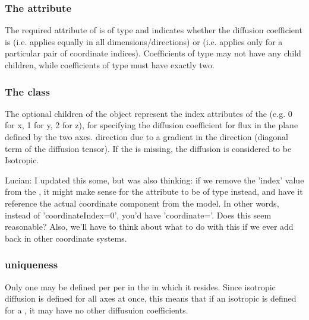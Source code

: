 \subsubsection{The  attribute}
The required  attribute of \DiffusionCoefficient is of type  and indicates whether the diffusion coefficient is  (i.e. applies equally in all dimensions/directions) or  (i.e. applies only for a particular pair of coordinate indices).  Coefficients of type  may not have any child \CoordinateIndex children, while coefficients of type  must have exactly two.


\subsubsection{The  class}
\label{CoordinateIndex-class}
The optional \CoordinateIndex children of the \DiffusionCoefficient object represent the index attributes of the \CoordinateComponent (e.g. 0 for x, 1 for y, 2 for z), for specifying the diffusion coefficient for flux in the plane defined by the two \CoordinateIndex axes.  
 direction due to a gradient in the  direction (diagonal term of the diffusion tensor).  If the  is missing, the diffusion is considered to be Isotropic.

{\color{red} Lucian: \notice I updated this some, but was also thinking:  if we remove the 'index' value from the \CoordinateComponent, it might make sense for the  attribute to be of type  instead, and have it reference the actual coordinate component from the model.  In other words, instead of 'coordinateIndex=0', you'd have 'coordinate='.  Does this seem reasonable?  Also, we'll have to think about what to do with this if we ever add back in other coordinate systems.}

\subsubsection{\DiffusionCoefficient uniqueness}
Only one \DiffusionCoefficient may be defined per \Species per  in the \Compartment in which it resides.  Since isotropic diffusion is defined for all axes at once, this means that if an isotropic \DiffusionCoefficient is defined for a \Species, it may have no other diffusuion coefficients.


